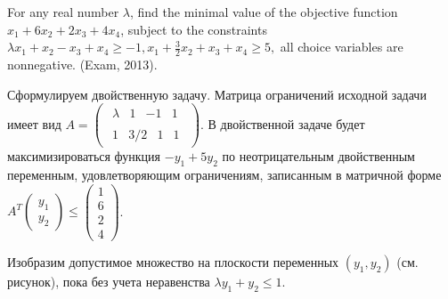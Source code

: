 \begin{problem}
For any real number $\lambda $, find the minimal value of the objective function $x_{1} +6x_{2} +2x_{3} +4x_{4} $, subject to the constraints $\lambda x_{1} +x_{2} -x_{3} +x_{4} \ge -1,  x_{1} +\frac{3}{2} x_{2} +x_{3} +x_{4} \ge 5,$ all choice variables are nonnegative. (Exam, 2013).



\begin{sol}
Сформулируем двойственную задачу. Матрица ограничений исходной задачи имеет вид $A=\left(\begin{array}{c} {\begin{array}{cccc} {\lambda } & {1} & {-1} & {1} \end{array}} \\ {\begin{array}{cccc} {1} & {3/2} & {1} & {1} \end{array}} \end{array}\right)$. В двойственной задаче будет максимизироваться функция $-y_{1} +5y_{2} $ по неотрицательным двойственным переменным, удовлетворяющим ограничениям, записанным в матричной форме $A^{T} \left(\begin{array}{c} {y_{1} } \\ {y_{2} } \end{array}\right)\le \left(\begin{array}{c} {1} \\ {6} \\ {2} \\ {4} \end{array}\right)$.

Изобразим допустимое множество на плоскости переменных $(y_{1} ,y_{2} )$ (см. рисунок), пока без учета неравенства $\lambda y_{1} +y_{2} \le 1$.




\end{sol}
\end{problem}
